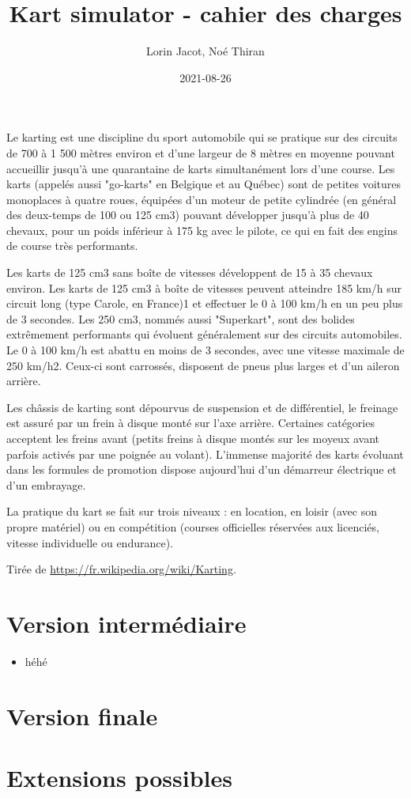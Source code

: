 \documentclass{article}
\title{Kart simulator - cahier des charges}
\date{2021-08-26}
\author{Lorin Jacot, Noé Thiran}
\begin{document}
\maketitle
{}

Le karting est une discipline du sport automobile qui se pratique sur des circuits de 700 à 1 500 mètres environ et d'une largeur de 8 mètres en moyenne pouvant accueillir jusqu'à une quarantaine de karts simultanément lors d'une course. Les karts (appelés aussi "go-karts" en Belgique et au Québec) sont de petites voitures monoplaces à quatre roues, équipées d’un moteur de petite cylindrée (en général des deux-temps de 100 ou 125 cm3) pouvant développer jusqu'à plus de 40 chevaux, pour un poids inférieur à 175 kg avec le pilote, ce qui en fait des engins de course très performants.

Les karts de 125 cm3 sans boîte de vitesses développent de 15 à 35 chevaux environ.
Les karts de 125 cm3 à boîte de vitesses peuvent atteindre 185 km/h sur circuit long (type Carole, en France)1 et effectuer le 0 à 100 km/h en un peu plus de 3 secondes.
Les 250 cm3, nommés aussi "Superkart", sont des bolides extrêmement performants qui évoluent généralement sur des circuits automobiles. Le 0 à 100 km/h est abattu en moins de 3 secondes, avec une vitesse maximale de 250 km/h2. Ceux-ci sont carrossés, disposent de pneus plus larges et d'un aileron arrière.

Les châssis de karting sont dépourvus de suspension et de différentiel, le freinage est assuré par un frein à disque monté sur l'axe arrière. Certaines catégories acceptent les freins avant (petits freins à disque montés sur les moyeux avant parfois activés par une poignée au volant). L'immense majorité des karts évoluant dans les formules de promotion dispose aujourd'hui d'un démarreur électrique et d'un embrayage.

La pratique du kart se fait sur trois niveaux : en location, en loisir (avec son propre matériel) ou en compétition (courses officielles réservées aux licenciés, vitesse individuelle ou endurance).

Tirée de \url{https://fr.wikipedia.org/wiki/Karting}.

\newpage
{}

\section{Version intermédiaire}
\begin{itemize}
    \item héhé
\end{itemize}

\section{Version finale}

\section{Extensions possibles}
\end{document}

